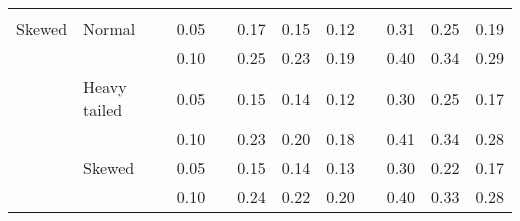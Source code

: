 \begin{table}[ht]
\begin{scriptsize}
\begin{tabular}{ll p{.1cm} c p{.1cm} rrr p{.1cm} rrr}
             &&&&&&&&&&&\\
Skewed       & Normal       && 0.05 &&  0.17 & 0.15 & 0.12 && 0.31 & 0.25 & 0.19 \\ 
             &              && 0.10 &&  0.25 & 0.23 & 0.19 && 0.40 & 0.34 & 0.29 \\ 
             & Heavy tailed && 0.05 &&  0.15 & 0.14 & 0.12 && 0.30 & 0.25 & 0.17 \\ 
             &              && 0.10 &&  0.23 & 0.20 & 0.18 && 0.41 & 0.34 & 0.28 \\ 
             & Skewed       && 0.05 &&  0.15 & 0.14 & 0.13 && 0.30 & 0.22 & 0.17 \\ 
             &              && 0.10 &&  0.24 & 0.22 & 0.20 && 0.40 & 0.33 & 0.28 \\ 

\hline
\end{tabular}
\end{scriptsize}
\end{table}

